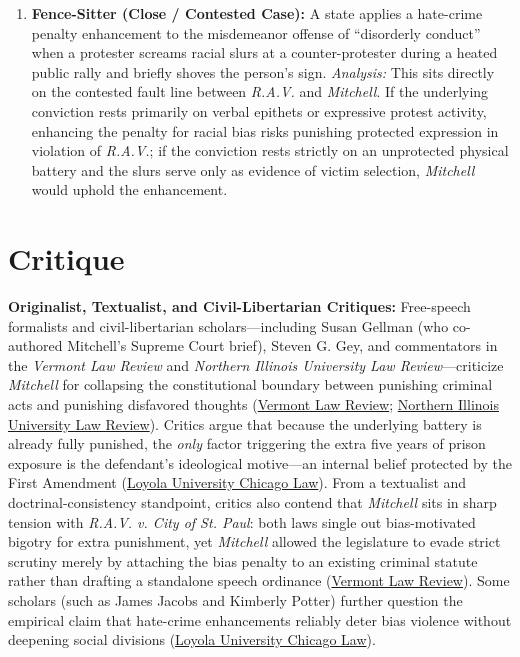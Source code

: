 \documentclass[12pt]{article}
\begin{document}
\begin{enumerate}
    \item \textbf{Fence-Sitter (Close / Contested Case):} A state applies a hate-crime penalty enhancement to the misdemeanor offense of ``disorderly conduct'' when a protester screams racial slurs at a counter-protester during a heated public rally and briefly shoves the person's sign. \textit{Analysis:} This sits directly on the contested fault line between \textit{R.A.V.} and \textit{Mitchell}. If the underlying conviction rests primarily on verbal epithets or expressive protest activity, enhancing the penalty for racial bias risks punishing protected expression in violation of \textit{R.A.V.}; if the conviction rests strictly on an unprotected physical battery and the slurs serve only as evidence of victim selection, \textit{Mitchell} would uphold the enhancement.
\end{enumerate}

\section{Critique}
\textbf{Originalist, Textualist, and Civil-Libertarian Critiques:} Free-speech formalists and civil-libertarian scholars---including Susan Gellman (who co-authored Mitchell's Supreme Court brief), Steven G. Gey, and commentators in the \textit{Vermont Law Review} and \textit{Northern Illinois University Law Review}---criticize \textit{Mitchell} for collapsing the constitutional boundary between punishing criminal acts and punishing disfavored thoughts (\href{https://lawreview.vermontlaw.edu/wp-content/uploads/2026/01/18VtLRev771.pdf}{Vermont Law Review}; \href{https://huskiecommons.lib.niu.edu/cgi/viewcontent.cgi?article=1569&context=niulr}{Northern Illinois University Law Review}). Critics argue that because the underlying battery is already fully punished, the \textit{only} factor triggering the extra five years of prison exposure is the defendant's ideological motive---an internal belief protected by the First Amendment (\href{https://lawecommons.luc.edu/cgi/viewcontent.cgi?article=1263&context=facpubs}{Loyola University Chicago Law}). From a textualist and doctrinal-consistency standpoint, critics also contend that \textit{Mitchell} sits in sharp tension with \textit{R.A.V. v. City of St. Paul}: both laws single out bias-motivated bigotry for extra punishment, yet \textit{Mitchell} allowed the legislature to evade strict scrutiny merely by attaching the bias penalty to an existing criminal statute rather than drafting a standalone speech ordinance (\href{https://lawreview.vermontlaw.edu/wp-content/uploads/2026/01/18VtLRev771.pdf}{Vermont Law Review}). Some scholars (such as James Jacobs and Kimberly Potter) further question the empirical claim that hate-crime enhancements reliably deter bias violence without deepening social divisions (\href{https://lawecommons.luc.edu/cgi/viewcontent.cgi?article=1263&context=facpubs}{Loyola University Chicago Law}).
\end{document}
